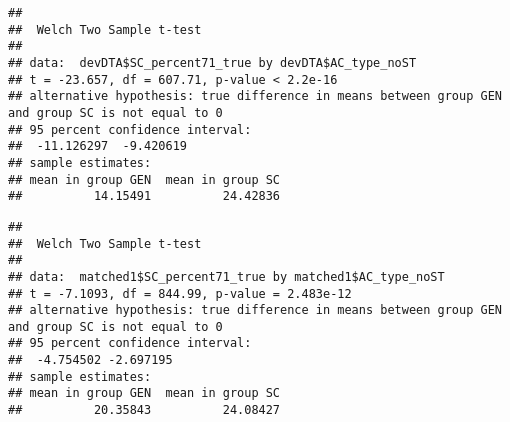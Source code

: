 \documentclass[
]{article}
\newenvironment{Shaded}{\begin{snugshade}}{\end{snugshade}}
\newcommand{\CommentTok}[1]{\textcolor[rgb]{0.56,0.35,0.01}{\textit{#1}}}
\newcommand{\DocumentationTok}[1]{\textcolor[rgb]{0.56,0.35,0.01}{\textbf{\textit{#1}}}}
\newcommand{\FunctionTok}[1]{\textcolor[rgb]{0.00,0.00,0.00}{#1}}
\newcommand{\NormalTok}[1]{#1}
\newcommand{\SpecialCharTok}[1]{\textcolor[rgb]{0.00,0.00,0.00}{#1}}
\begin{document}
\begin{Shaded}
\end{Shaded}

\begin{verbatim}
## 
##  Welch Two Sample t-test
## 
## data:  devDTA$SC_percent71_true by devDTA$AC_type_noST
## t = -23.657, df = 607.71, p-value < 2.2e-16
## alternative hypothesis: true difference in means between group GEN and group SC is not equal to 0
## 95 percent confidence interval:
##  -11.126297  -9.420619
## sample estimates:
## mean in group GEN  mean in group SC 
##          14.15491          24.42836
\end{verbatim}

\begin{Shaded}
\end{Shaded}

\begin{verbatim}
## 
##  Welch Two Sample t-test
## 
## data:  matched1$SC_percent71_true by matched1$AC_type_noST
## t = -7.1093, df = 844.99, p-value = 2.483e-12
## alternative hypothesis: true difference in means between group GEN and group SC is not equal to 0
## 95 percent confidence interval:
##  -4.754502 -2.697195
## sample estimates:
## mean in group GEN  mean in group SC 
##          20.35843          24.08427
\end{verbatim}
\end{document}
